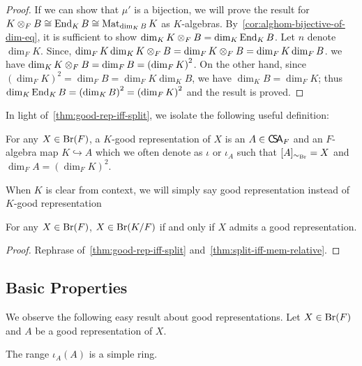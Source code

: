 \begin{proof}
   If we can show that $\mu'$ is a bijection, we will prove the result for $K\otimes_{F} B \cong \operatorname{End}_{K} B \cong \operatorname{Mat}_{\dim_{K} B}K$ as $K$-algebras. By~\cref{cor:alghom-bijective-of-dim-eq}, it is sufficient to show $\dim_{K}K\otimes_{F}B = \dim_{K}\operatorname{End}_{K}B$. Let $n$ denote $\dim_{F}K$. Since, $\dim_{F}K\dim_{K}K\otimes_{F}B =\dim_{F}K\otimes_{F}B=\dim_{F}K \dim_{F}B$. we have $\dim_{K}K\otimes_{F}B = \dim_{F}B = {\left(\dim_{F}K\right)}^{2}$. On the other hand, since ${\left(\dim_{F}K\right)}^{2}=\dim_{F} B = \dim_{F}K\dim_{K}B$, we have $\dim_{K} B = \dim_{F}K$; thus $\dim_{K}\operatorname{End}_{K} B = {\left(\dim_{K}B\right)}^{2}={\left(\dim_{F}K\right)}^{2}$ and the result is proved.
 \end{proof}

 In light of~\cref{thm:good-rep-iff-split}, we isolate the following useful definition:
 \begin{definition}\label{def:good-rep}
   For any $X \in \operatorname{Br}(F)$, a $K$-good representation of $X$ is an $A \in \operatorname{\mathsf{C}\!\mathsf{S}\!\mathsf{A}}_{F}$ and an $F$-algebra map $K \hookrightarrow A$ which we often denote as $\iota$ or $\iota_{A}$ such that $[A]_{\sim_{\operatorname{Br}}} = X$ and $\dim_{F}A={\left(\dim_{F}K\right)}^{2}$.
   \leanok
 \end{definition}

 When $K$ is clear from context, we will simply say good representation instead of $K$-good representation

 \begin{corollary}
   \label{cor:mem-relative-br-iff-good-rep}
   For any $X\in\operatorname{Br}(F)$, $X\in\operatorname{Br}(K/F)$ if and only if $X$ admits a good representation.
   \leanok
 \end{corollary}
 \begin{proof}
   Rephrase of~\cref{thm:good-rep-iff-split} and~\cref{thm:split-iff-mem-relative}.
 \end{proof}

\subsection{Basic Properties}
We observe the following easy result about good representations. Let $X \in \operatorname{Br}(F)$ and $A$ be a good representation of $X$.

\begin{lemma}
  The range $\iota_{A}(A)$ is a simple ring.
  \leanok
\end{lemma}

